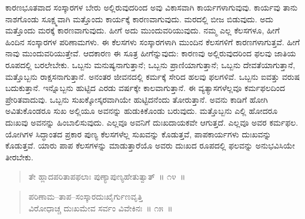 ಕಾರಣಭೂತವಾದ ಸಂಸ್ಕಾರಗಳ ಬೇರು ಅಲ್ಲಿರುವುದರಿಂದ ಅವು ವಿಕಾಸವಾಗಿ ಕಾರ್ಯಗಳಾಗುವುವು. ಕಾರ್ಯವು ತಾನು ನಾಶಗೊಂಡು ಸೂಕ್ಷ್ಮವಾಗಿ ಮತ್ತೊಂದು ಕಾರ್ಯಕ್ಕೆ ಕಾರಣವಾಗುವುದು. ಮರದಲ್ಲಿ ಬೀಜ ಬಿಡುವುದು. ಅದು ಮತ್ತೊಂದು ಮರಕ್ಕೆ ಕಾರಣವಾಗುವುದು. ಹೀಗೆ ಅದು ಮುಂದುವರಿಯುವುದು. ನಮ್ಮ ಎಲ್ಲ ಕೆಲಸಗಳೂ, ಹೀಗೆ ಹಿಂದಿನ ಸಂಸ್ಕಾರಗಳ ಪರಿಣಾಮಗಳು. ಈ ಕೆಲಸಗಳು ಸಂಸ್ಕಾರಗಳಾಗಿ ಮುಂದಿನ ಕೆಲಸಗಳಿಗೆ ಕಾರಣಗಳಾಗುತ್ತವೆ. ಹೀಗೆ ನಾವು ಮುಂದುವರಿಯುತ್ತೇವೆ. ಆದಕಾರಣ ಈ ಸೂತ್ರ ಹೀಗೆನ್ನುವುದು: ಕಾರಣವು ಅಲ್ಲಿರುವುದರಿಂದ ಫಲವು ಜಾತಿಯ ರೂಪದಲ್ಲಿ ಬರಲೇಬೇಕು. ಒಬ್ಬನು ಮನುಷ್ಯನಾಗುತ್ತಾನೆ; ಒಬ್ಬನು ಪ್ರಾಣಿಯಾಗುತ್ತಾನೆ; ಒಬ್ಬನು ದೇವತೆಯಾಗುತ್ತಾನೆ, ಮತ್ತೊಬ್ಬನು ರಾಕ್ಷಸನಾಗುತ್ತಾನೆ. ಅನಂತರ ಜೀವನದಲ್ಲಿ ಕರ್ಮಕ್ಕೆ ಸೇರಿದ ಹಲವು ಫಲಗಳಿವೆ. ಒಬ್ಬನು ಐವತ್ತು ವರುಷ ಬದುಕುತ್ತಾನೆ. ಇನ್ನೊಬ್ಬನು ಹುಟ್ಟಿದ ಎರಡು ವರ್ಷಕ್ಕೇ ಕಾಲವಾಗುತ್ತಾನೆ. ಈ ವ್ಯತ್ಯಾಸಗಳೆಲ್ಲವೂ ಕರ್ಮಫಲದಿಂದ ಪ್ರೇರಿತವಾದುವು. ಒಬ್ಬನು ಸುಖಕ್ಕೋಸ್ಕರವಾಗಿಯೇ ಹುಟ್ಟಿದನೆಂದು ತೋರುತ್ತಾನೆ. ಅವನು ಕಾಡಿಗೆ ಹೋಗಿ ಅವಿತುಕೊಂಡರೂ ಸುಖ ಅಲ್ಲಿಯೂ ಅವನನ್ನು ಹುಡುಕಿಕೊಂಡು ಬರುವುದು. ಮತ್ತೊಬ್ಬನು ಎಲ್ಲಿ ಹೋದರೂ ದುಃಖವು ಅವನನ್ನು ಹಿಂಬಾಲಿಸುವುದು. ಎಲ್ಲವೂ ಅವನಿಗೆ ದುಃಖದಾಯಕವೇ ಆಗುತ್ತದೆ. ಎಲ್ಲವೂ ಅವರ ಕರ್ಮಫಲ. ಯೋಗಿಗಳ ಸಿದ್ಧಾಂತದ ಪ್ರಕಾರ ಪುಣ್ಯ ಕೆಲಸಗಳೆಲ್ಲ ಸುಖವನ್ನು ಕೊಡುತ್ತವೆ, ಪಾಪಕಾರ್ಯಗಳು ದುಃಖವನ್ನು ಕೊಡುತ್ತವೆ. ಯಾರು ಪಾಪ ಕೆಲಸಗಳನ್ನು ಮಾಡುತ್ತಾರೆಯೊ ಅವರು ದುಃಖದ ರೂಪದಲ್ಲಿ ಫಲವನ್ನು ಅನುಭವಿಸಿಯೇ ತೀರಬೇಕು. 

\vspace{-0.2cm}

\begin{verse}
ತೇ ಹ್ಲಾದಪರಿತಾಪಫಲಾಃ ಪುಣ್ಯಾಪುಣ್ಯಹೇತುತ್ವಾತ್​~॥ ೧೪~॥
\end{verse}

\vspace{-0.3cm}


\vspace{-0.1cm}

\begin{verse}
ಪರಿಣಾಮ–ತಾಪ–ಸಂಸ್ಕಾರದುಃಖೈರ್ಗುಣವೃತ್ತಿ\\ವಿರೋಧಾಚ್ಚ ದುಃಖಮೇವ ಸರ್ವಂ ವಿವೇಕಿನಃ~॥ ೧೫~॥
\end{verse}

\vspace{-0.3cm}


\vspace{0.1cm}

